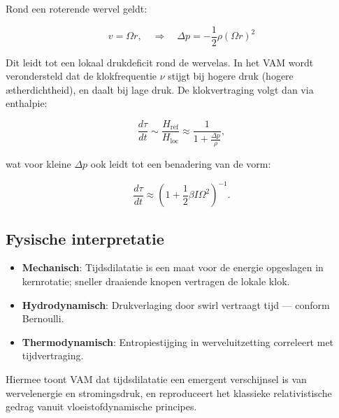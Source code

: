 Rond een roterende wervel geldt:

\[
v = \Omega r, \quad \Rightarrow \quad \Delta p = -\frac{1}{2} \rho (\Omega r)^2
\]

Dit leidt tot een lokaal drukdeficit rond de wervelas. In het VAM wordt verondersteld dat de klokfrequentie $\nu$ stijgt bij hogere druk (hogere ætherdichtheid), en daalt bij lage druk. De klokvertraging volgt dan via enthalpie:

\begin{equation}
\frac{d\tau}{dt} \sim \frac{H_\text{ref}}{H_\text{loc}} \approx \frac{1}{1 + \frac{\Delta p}{\rho}},
\end{equation}

wat voor kleine $\Delta p$ ook leidt tot een benadering van de vorm:

\begin{equation}
\frac{d\tau}{dt} \approx \left(1 + \frac{1}{2} \beta I \Omega^2 \right)^{-1}.
\end{equation}

\subsection{Fysische interpretatie}

\begin{itemize}
    \item \textbf{Mechanisch}: Tijdsdilatatie is een maat voor de energie opgeslagen in kernrotatie; sneller draaiende knopen vertragen de lokale klok.
    \item \textbf{Hydrodynamisch}: Drukverlaging door swirl vertraagt tijd — conform Bernoulli.
    \item \textbf{Thermodynamisch}: Entropiestijging in werveluitzetting correleert met tijdvertraging.
\end{itemize}

Hiermee toont VAM dat tijdsdilatatie een emergent verschijnsel is van wervelenergie en stromingsdruk, en reproduceert het klassieke relativistische gedrag vanuit vloeistofdynamische principes.